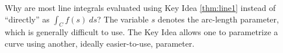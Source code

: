 {Why are most line integrals evaluated using Key Idea \ref{thm:line1} instead of ``directly'' as $\int_C f(s)\ ds$?
}
{The variable $s$ denotes the arc-length parameter, which is generally difficult to use. The Key Idea allows one to parametrize a curve using another, ideally easier-to-use, parameter.
}
